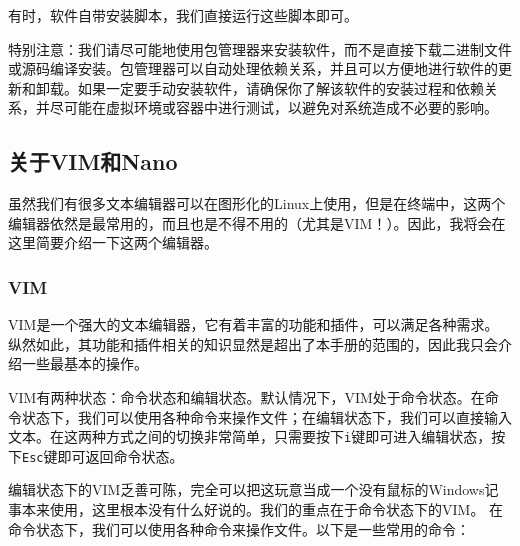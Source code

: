 \documentclass[../main.tex]{subfiles}
\begin{document}
有时，软件自带安装脚本，我们直接运行这些脚本即可。

特别注意：我们请尽可能地使用包管理器来安装软件，而不是直接下载二进制文件或源码编译安装。包管理器可以自动处理依赖关系，并且可以方便地进行软件的更新和卸载。如果一定要手动安装软件，请确保你了解该软件的安装过程和依赖关系，并尽可能在虚拟环境或容器中进行测试，以避免对系统造成不必要的影响。

\subsection{关于VIM和Nano}

虽然我们有很多文本编辑器可以在图形化的Linux上使用，但是在终端中，这两个编辑器依然是最常用的，而且也是不得不用的（尤其是VIM！）。因此，我将会在这里简要介绍一下这两个编辑器。

\subsubsection{VIM}

VIM是一个强大的文本编辑器，它有着丰富的功能和插件，可以满足各种需求。纵然如此，其功能和插件相关的知识显然是超出了本手册的范围的，因此我只会介绍一些最基本的操作。

VIM有两种状态：命令状态和编辑状态。默认情况下，VIM处于命令状态。在命令状态下，我们可以使用各种命令来操作文件；在编辑状态下，我们可以直接输入文本。在这两种方式之间的切换非常简单，只需要按下\texttt{i}键即可进入编辑状态，按下\texttt{Esc}键即可返回命令状态。

编辑状态下的VIM乏善可陈，完全可以把这玩意当成一个没有鼠标的Windows记事本来使用，这里根本没有什么好说的。我们的重点在于命令状态下的VIM。
在命令状态下，我们可以使用各种命令来操作文件。以下是一些常用的命令：
\end{document}
